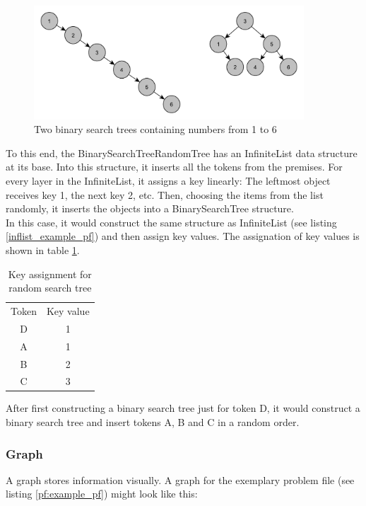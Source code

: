 \documentclass[hidelinks]{scrartcl}
\begin{document}
\begin{figure}[H]
	\caption{Two binary search trees containing numbers from 1 to 6}
	\label{img:random_tree}
	\centering
	\includegraphics[width=0.9\textwidth]{Illustrations/BinarySearchTreeRandomTree.pdf}
\end{figure}

To this end, the BinarySearchTreeRandomTree has an InfiniteList data structure at its base. Into this structure, it inserts all the \gls{token}s from the \gls{premise}s. For every layer in the InfiniteList, it assigns a key linearly: The leftmost object receives key 1, the next key 2, etc. Then, choosing the items from the list randomly, it inserts the objects into a BinarySearchTree structure. \\
In this case, it would construct the same structure as InfiniteList (see listing \ref{inflist_example_pf}) and then assign key values. The assignation of key values is shown in table \ref{tab:random_search_tree_keys}.

\begin{table}[H]
\caption{Key assignment for random search tree} 
\label{tab:random_search_tree_keys}
\centering
	\begin{tabular}{c c}
	Token 	& Key value \\
	D		& 1 \\
	\hline
	A		& 1 \\
	B		& 2 \\
	C		& 3
	\end{tabular}
\end{table}

After first constructing a binary search tree just for \gls{token} D, it would construct a binary search tree and insert \gls{token}s A, B and C in a random order.

\subsubsection{Graph}
A graph stores information visually. A graph for the exemplary problem file (see listing \ref{pf:example_pf}) might look like this:
\end{document}
